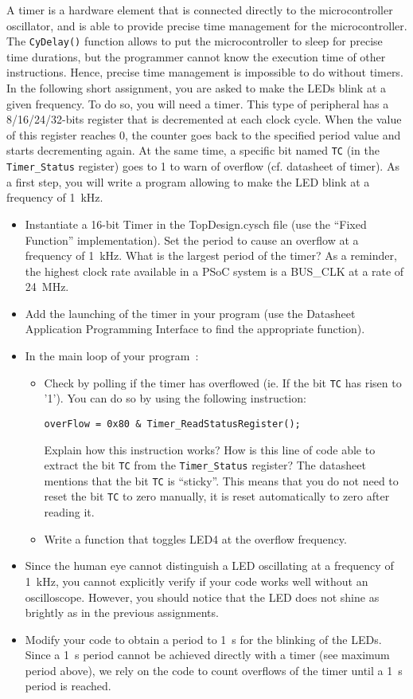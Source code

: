 A timer is a hardware element that is connected directly to the microcontroller oscillator, and is able to provide precise time management for the microcontroller. The \texttt{CyDelay()} function allows to put the microcontroller to sleep for precise time durations, but the programmer cannot know the execution time of other instructions. Hence, precise time management is impossible to do without timers. 
\\
In the following short assignment, you are asked to make the LEDs blink at a given frequency. To do so, you will need a timer. This type of peripheral has a 8/16/24/32-bits register that is decremented at each clock cycle. When the value of this register reaches 0, the counter goes back to the specified period value and starts decrementing again. At the same time, a specific bit named \texttt{TC} (in the \texttt{Timer\_Status} register) goes to 1 to warn of overflow (cf. datasheet of timer). As a first step, you will write a program allowing to make the LED blink at a frequency of 1~kHz.
\begin{itemize}
	\item Instantiate a 16-bit Timer in the TopDesign.cysch file (use the ``Fixed Function'' implementation). Set the period to cause an overflow at a frequency of 1~kHz. What is the largest period of the timer? As a reminder, the highest clock rate available in a PSoC system is a BUS\_CLK at a rate of 24~MHz.
	\item Add the launching of the timer in your program (use the Datasheet Application Programming Interface to find the appropriate function). 
	\item In the main loop of your program~:
	\begin{itemize}
		\item Check by polling if the timer has overflowed (ie. If the bit \texttt{TC} has risen to '1'). You can do so by using the following instruction: 
\begin{lstlisting}[style=customc]
overFlow = 0x80 & Timer_ReadStatusRegister(); 
\end{lstlisting}
			Explain how this instruction works? How is this line of code able to extract the bit \texttt{TC} from the \texttt{Timer\_Status} register? The datasheet mentions that the bit \texttt{TC} is ``sticky''. This means that you do not need to reset the bit \texttt{TC} to zero manually, it is reset automatically to zero after reading it.  
		\item Write a function that toggles LED4 at the overflow frequency. 
	\end{itemize}
	\item Since the human eye cannot distinguish a LED oscillating at a frequency of 1~kHz, you cannot explicitly verify if your code works well without an oscilloscope. However, you should notice that the LED does not shine as brightly as in the previous assignments. 
	\item Modify your code to obtain a period to 1~s for the blinking of the LEDs. Since a 1~s period cannot be achieved directly with a timer (see maximum period above), we rely on the code to count overflows of the timer until a 1~s period is reached. 
\end{itemize}

